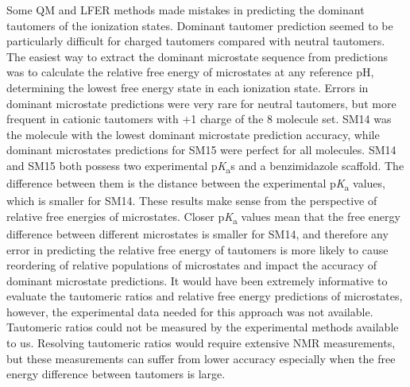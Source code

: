 \documentclass[9pt,lineno,final]{elife}
\newcommand{\pKa}{p\textit{K}\textsubscript{a}}
\begin{document}
Some QM and LFER methods made mistakes in predicting the dominant tautomers of the ionization states. 
Dominant tautomer prediction seemed to be particularly difficult for charged tautomers compared with neutral tautomers. 
The easiest way to extract the dominant microstate sequence from predictions was to calculate the relative free energy of microstates at any reference pH, determining the lowest free energy state in each ionization state.
Errors in dominant microstate predictions were very rare for neutral tautomers, but more frequent in cationic tautomers with +1 charge of the 8 molecule set. 
SM14 was the molecule with the lowest dominant microstate prediction accuracy, while dominant microstates predictions for SM15 were perfect for all molecules. 
SM14 and SM15 both possess two experimental \pKa{}s and a benzimidazole scaffold. 
The difference between them is the distance between the experimental \pKa{} values, which is smaller for SM14. 
These results make sense from the perspective of relative free energies of microstates. 
Closer \pKa{} values mean that the free energy difference between different microstates is smaller for SM14, and therefore any error in predicting the relative free energy of tautomers is more likely to cause reordering of relative populations of microstates and impact the accuracy of dominant microstate predictions. 
It would have been extremely informative to evaluate the tautomeric ratios and relative free energy predictions of microstates, however, the experimental data needed for this approach was not available. 
Tautomeric ratios could not be measured by the experimental methods available to us. 
Resolving tautomeric ratios would require extensive NMR measurements, but these measurements can suffer from lower accuracy especially when the free energy difference between tautomers is large.

\end{document}
